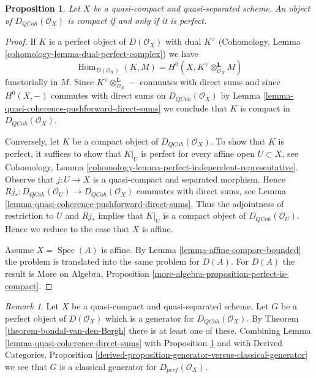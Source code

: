 \documentclass{stacks-project}
\theoremstyle{plain}
\newtheorem{proposition}[subsection]{Proposition}
\theoremstyle{definition}
\theoremstyle{remark}
\newtheorem{remark}[subsection]{Remark}
\numberwithin{equation}{subsection}
\def\Spec{\mathop{\mathrm{Spec}}}
\def\Hom{\mathop{\mathrm{Hom}}\nolimits}
\def\QCoh{\mathit{QCoh}}
\begin{document}
\begin{proposition}
\label{proposition-compact-is-perfect}
Let $X$ be a quasi-compact and quasi-separated scheme.
An object of $D_\QCoh(\mathcal{O}_X)$ is compact
if and only if it is perfect.
\end{proposition}

\begin{proof}
If $K$ is a perfect object of $D(\mathcal{O}_X)$ with dual
$K^\vee$ (Cohomology, Lemma \ref{cohomology-lemma-dual-perfect-complex})
we have
$$
\Hom_{D(\mathcal{O}_X)}(K, M) =
H^0(X, K^\vee \otimes_{\mathcal{O}_X}^\mathbf{L} M)
$$
functorially in $M$. Since $K^\vee \otimes_{\mathcal{O}_X}^\mathbf{L} -$
commutes with direct sums and since $H^0(X, -)$ commutes with direct
sums on $D_\QCoh(\mathcal{O}_X)$ by
Lemma \ref{lemma-quasi-coherence-pushforward-direct-sums}
we conclude that $K$ is compact in $D_\QCoh(\mathcal{O}_X)$.

\medskip\noindent
Conversely, let $K$ be a compact object of $D_\QCoh(\mathcal{O}_X)$.
To show that $K$ is perfect, it suffices to show that
$K|_U$ is perfect for every affine open $U \subset X$, see
Cohomology, Lemma \ref{cohomology-lemma-perfect-independent-representative}.
Observe that $j : U \to X$ is a quasi-compact and separated morphism.
Hence
$Rj_* : D_\QCoh(\mathcal{O}_U) \to D_\QCoh(\mathcal{O}_X)$
commutes with direct sums, see
Lemma \ref{lemma-quasi-coherence-pushforward-direct-sums}.
Thus the adjointness of restriction to $U$ and $Rj_*$ implies that
$K|_U$ is a compact object of $D_\QCoh(\mathcal{O}_U)$.
Hence we reduce to the case that $X$ is affine.

\medskip\noindent
Assume $X = \Spec(A)$ is affine. By Lemma \ref{lemma-affine-compare-bounded}
the problem is translated into the same problem for $D(A)$.
For $D(A)$ the result is
More on Algebra, Proposition \ref{more-algebra-proposition-perfect-is-compact}.
\end{proof}

\begin{remark}
\label{remark-classical-generator}
Let $X$ be a quasi-compact and quasi-separated scheme. Let $G$ be a
perfect object of $D(\mathcal{O}_X)$ which is a generator for
$D_\QCoh(\mathcal{O}_X)$. By Theorem \ref{theorem-bondal-van-den-Bergh}
there is at least one of these. Combining
Lemma \ref{lemma-quasi-coherence-direct-sums} with
Proposition \ref{proposition-compact-is-perfect} and with
Derived Categories, Proposition
\ref{derived-proposition-generator-versus-classical-generator}
we see that $G$ is a classical generator for $D_{perf}(\mathcal{O}_X)$.
\end{remark}
\end{document}
